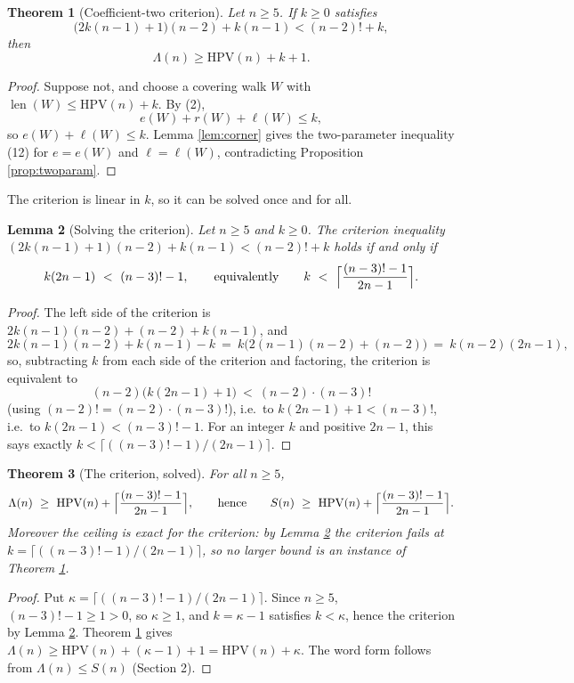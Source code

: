 \documentclass[11pt]{article}
\newtheorem{theorem}{Theorem}
\newtheorem{lemma}[theorem]{Lemma}
\DeclareMathOperator{\len}{len}
\newcommand{\HPV}{\mathrm{HPV}}
\begin{document}
\begin{theorem}[Coefficient-two criterion]\label{thm:criterion}
Let \(n\ge 5\).  If \(k\ge 0\) satisfies
\[
  \bigl(2k(n-1)+1\bigr)(n-2)+k(n-1)<(n-2)!+k,
\]
then
\[
  \Lambda(n)\ge \HPV(n)+k+1.
\]
\end{theorem}

\begin{proof}
Suppose not, and choose a covering walk \(W\) with \(\len(W)\le \HPV(n)+k\).  By (2),
\[
  e(W)+r(W)+\ell(W)\le k,
\]
so \(e(W)+\ell(W)\le k\).  Lemma \ref{lem:corner} gives the two-parameter inequality (12) for
\(e=e(W)\) and \(\ell=\ell(W)\), contradicting Proposition \ref{prop:twoparam}.
\end{proof}

The criterion is linear in \(k\), so it can be solved once and for all.

\begin{lemma}[Solving the criterion]\label{lem:solve}
Let \(n\ge5\) and \(k\ge0\).  The criterion inequality
\((2k(n-1)+1)(n-2)+k(n-1)<(n-2)!+k\) holds if and only if
\[
  k(2n-1)\ <\ (n-3)!-1,
  \qquad\text{equivalently}\qquad
  k\ <\ \Bigl\lceil\frac{(n-3)!-1}{2n-1}\Bigr\rceil .
\]
\end{lemma}

\begin{proof}
The left side of the criterion is \(2k(n-1)(n-2)+(n-2)+k(n-1)\), and
\[
  2k(n-1)(n-2)+k(n-1)-k \ =\ k\bigl(2(n-1)(n-2)+(n-2)\bigr)\ =\ k(n-2)(2n-1),
\]
so, subtracting \(k\) from each side of the criterion and factoring, the criterion is
equivalent to
\[
  (n-2)\bigl(k(2n-1)+1\bigr)\ <\ (n-2)\cdot(n-3)!
\]
(using \((n-2)!=(n-2)\cdot(n-3)!\)), i.e.\ to \(k(2n-1)+1<(n-3)!\), i.e.\ to
\(k(2n-1)<(n-3)!-1\).  For an integer \(k\) and positive \(2n-1\), this says exactly
\(k<\lceil((n-3)!-1)/(2n-1)\rceil\).
\end{proof}

\begin{theorem}[The criterion, solved]\label{thm:solved}
For all \(n\ge 5\),
\[
  \Lambda(n)\ \ge\ \HPV(n)+\Bigl\lceil\frac{(n-3)!-1}{2n-1}\Bigr\rceil,
  \qquad\text{hence}\qquad
  S(n)\ \ge\ \HPV(n)+\Bigl\lceil\frac{(n-3)!-1}{2n-1}\Bigr\rceil .
\]
Moreover the ceiling is exact for the criterion: by Lemma \ref{lem:solve} the criterion fails at
\(k=\lceil((n-3)!-1)/(2n-1)\rceil\), so no larger bound is an instance of Theorem
\ref{thm:criterion}.
\end{theorem}

\begin{proof}
Put \(\kappa=\lceil((n-3)!-1)/(2n-1)\rceil\).  Since \(n\ge5\), \((n-3)!-1\ge1>0\), so
\(\kappa\ge1\), and \(k=\kappa-1\) satisfies \(k<\kappa\), hence the criterion by Lemma
\ref{lem:solve}.  Theorem \ref{thm:criterion} gives
\(\Lambda(n)\ge\HPV(n)+(\kappa-1)+1=\HPV(n)+\kappa\).  The word form follows from
\(\Lambda(n)\le S(n)\) (Section 2).
\end{proof}
\end{document}

